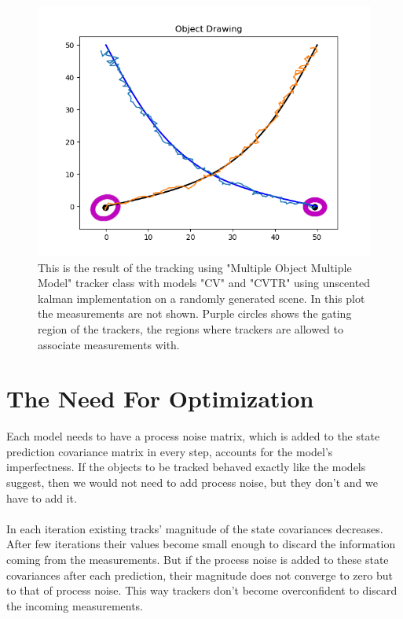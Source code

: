 \documentclass[peerreview]{IEEEtran}
\begin{document}
\begin{figure}[htbp]
\centerline{\includegraphics[scale=.4]{multiTarget_multipleModel_cross.png}}
\caption{This is the result of the tracking using "Multiple Object Multiple Model" tracker class with models "CV" and "CVTR" using unscented kalman implementation on a randomly generated scene. In this plot the measurements are not shown. Purple circles shows the gating region of the trackers, the regions where trackers are allowed to associate measurements with.}
\label{fig}
\end{figure}


\section{The Need For Optimization}
Each model needs to have a process noise matrix, which is added to the state prediction covariance matrix in every step, accounts for the model's imperfectness. If the objects to be tracked behaved exactly like the models suggest, then we would not need to add process noise, but they don't and we have to add it. \\ \\

In each iteration existing tracks' magnitude of the state covariances decreases. After few iterations their values become small enough to discard the information coming from the measurements. But if the process noise is added to these state covariances after each prediction, their magnitude does not converge to zero but to that of process noise. This way trackers don't become overconfident to discard the incoming measurements. \\ \\
\end{document}
